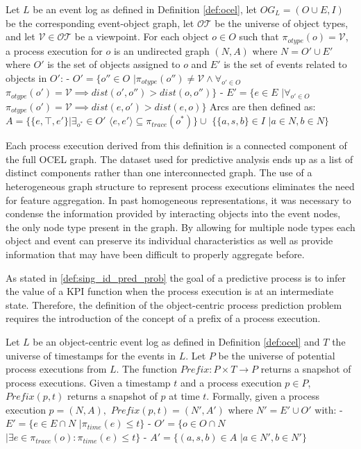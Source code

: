         \begin{definition}
        \label{def:proc_exec}
            Let $L$ be an event log as defined in Definition \ref{def:ocel}, let $OG_L=(O \cup E,I)$ be the corresponding event-object graph, let $\mathcal{OT}$ be the universe of object types, and let $\mathcal{V} \in \mathcal{OT}$ be a viewpoint.
            For each object $o\in O$ such that $\pi_{otype}(o)=\mathcal{V}$, a process execution for $o$ is an undirected graph $(N,A)$ where $N=O'\cup E'$ where $O'$ is the set of objects assigned to $o$ and $E'$ is the set of events related to objects in $O'$:
            - $O'=\{o''\in O$ $|\pi_{otype}(o'') \neq \mathcal{V} \land \forall_{o'\in O}$ $\pi_{otype}(o')=\mathcal{V} \implies dist(o', o'') > dist(o, o'')\}$
            - $E' = \{e\in E$ $|\forall_{o'\in O}$ $\pi_{otype}(o')=\mathcal{V} \implies dist(e,o') > dist(e,o)\}$
            Arcs are then defined as: $A=\{\{e, \top, e'\} | \exists_{o^*} \in O'$ $\langle e, e'\rangle \subseteq \pi_{trace}(o^*)\}\cup$ $\{\{a,s,b\}\in I$ $| a\in N, b \in N \}$
        \end{definition}
        
        Each process execution derived from this definition is a connected component of the full OCEL graph. The dataset used for predictive analysis ends up as a list of distinct components rather than one interconnected graph.
        The use of a heterogeneous graph structure to represent process executions eliminates the need for feature aggregation. In past homogeneous representations, it was necessary to condense the information provided by interacting objects into the event nodes, the only node type present in the graph. By allowing for multiple node types each object and event can preserve its individual characteristics as well as provide information that may have been difficult to properly aggregate before. 

        As stated in \ref{def:sing_id_pred_prob} the goal of a predictive process is to infer the value of a KPI function when the process execution is at an intermediate state. Therefore, the definition of the object-centric process prediction problem requires the introduction of the concept of a prefix of a process execution.

        \begin{definition}
        \label{def:prefix}
            Let $L$ be an object-centric event log as defined in Definition \ref{def:ocel} and $T$ the universe of timestamps for the events in $L$. Let $P$ be the universe of potential process executions from $L$. The function $Prefix:P\times T \to P$ returns a snapshot of process executions. Given a timestamp $t$ and a process execution $p\in P$, $Prefix(p,t)$ returns a snapshot of $p$ at time $t$. Formally, given a process execution $p=(N,A),$ $Prefix(p,t)=(N',A')$ where $N'=E'\cup O'$ with:
            - $E' = \{e \in E\cap N$ $|\pi_{time}(e)\leq t\}$
            - $O' = \{o \in O\cap N$ $|\exists e \in \pi_{trace}(o) : \pi_{time}(e) \leq t\}$
            - $A' = \{(a,s,b) \in A$ $|a \in N', b \in N'\}$
        \end{definition}
        
